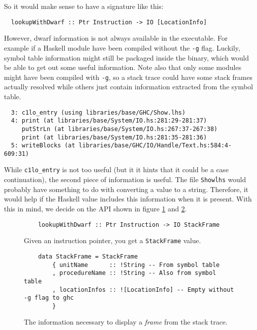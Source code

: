 So it would make sense to have a signature like this:

\begin{verbatim}
  lookupWithDwarf :: Ptr Instruction -> IO [LocationInfo]
\end{verbatim}

However, dwarf information is not always available in the executable.
For example if a Haskell module have been compiled without the
\texttt{-g} flag. Luckily, symbol table information might still be
packaged inside the binary, which would be able to get out some useful
information. Note also that only some modules might have been compiled
with \texttt{-g}, so a stack trace could have some stack frames actually
resolved while others just contain information extracted from the symbol
table.

\begin{verbatim}
  3: c1lo_entry (using libraries/base/GHC/Show.lhs)
  4: print (at libraries/base/System/IO.hs:281:29-281:37)
     putStrLn (at libraries/base/System/IO.hs:267:37-267:38)
     print (at libraries/base/System/IO.hs:281:35-281:36)
  5: writeBlocks (at libraries/base/GHC/IO/Handle/Text.hs:584:4-609:31)
\end{verbatim}

While \texttt{c1lo\_entry} is not too useful (but it it hints that it
could be a case continuation), the second piece of information is
useful. The file \texttt{Show\.lhs} would probably have something to do
with converting a value to a string. Therefore, it would help if the
Haskell value includes this information when it is present. With this
in mind, we decide on the API shown in figure \ref{fig:lookup_with_dwarf}
and \ref{fig:stack_frame}.

\begin{figure}
\begin{mdframed}
  \begin{verbatim}
    lookupWithDwarf :: Ptr Instruction -> IO StackFrame
  \end{verbatim}
  \caption{Given an instruction pointer, you get a \texttt{StackFrame} value.}
  \label{fig:lookup_with_dwarf}
\end{mdframed}
\end{figure}

\begin{figure}
\begin{mdframed}
  \begin{verbatim}
    data StackFrame = StackFrame
        { unitName      :: !String -- From symbol table
        , procedureName :: !String -- Also from symbol table
        , locationInfos :: ![LocationInfo] -- Empty without -g flag to ghc
        }
  \end{verbatim}
  \caption{The information necessary to display a \emph{frame} from the stack
    trace.}
  \label{fig:stack_frame}
\end{mdframed}
\end{figure}

